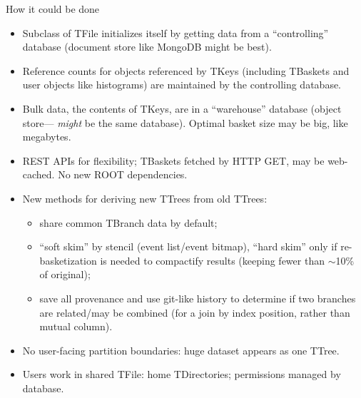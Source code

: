 \documentclass[aspectratio=169]{beamer}
\begin{document}
\begin{frame}{How it could be done}
\vspace{0.3 cm}
\begin{itemize}
\item<1-> Subclass of TFile initializes itself by getting data from a ``controlling'' database (document store like MongoDB might be best).
\item<2-> Reference counts for objects referenced by TKeys (including TBaskets and user objects like histograms) are maintained by the controlling database.
\item<3-> Bulk data, the contents of TKeys, are in a ``warehouse'' database (object store--- \mbox{\it might} be the same database). Optimal basket size may be big, like megabytes.
\item<4-> REST APIs for flexibility; TBaskets fetched by HTTP GET, may be web-cached. No new ROOT dependencies.
\item<5-> New methods for deriving new TTrees from old TTrees:
\begin{itemize}
\item<6-> share common TBranch data by default;
\item<7-> ``soft skim'' by stencil (event list/event bitmap), ``hard skim'' only if re-basketization is needed to compactify results (keeping fewer than $\sim$10\% of original);
\item<8-> save all provenance and use git-like history to determine if two branches are related/may be combined (for a join by index position, rather than mutual column).
\end{itemize}
\item<9-> No user-facing partition boundaries: huge dataset appears as one TTree.
\item<10-> Users work in shared TFile: home TDirectories; permissions managed by database.
\end{itemize}
\end{frame}
\end{document}
